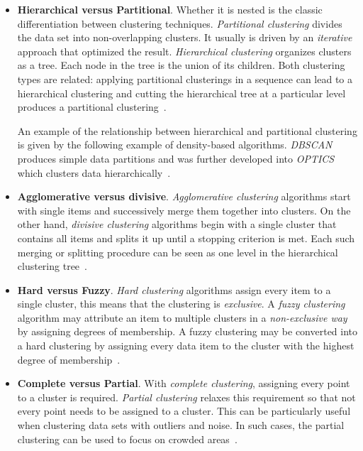 \begin{itemize}

\item \textbf{Hierarchical versus Partitional}. Whether it is nested is the classic differentiation between clustering techniques. \textit{Partitional clustering} divides the data set into non-overlapping clusters. It usually is driven by an \textit{iterative} approach that optimized the result.
\textit{Hierarchical clustering} organizes clusters as a tree. Each node in the tree is the union of its children. Both clustering types are related: applying partitional clusterings in a sequence can lead to a hierarchical clustering and cutting the hierarchical tree at a particular level produces a partitional clustering~\cite{Meert06clustermaps}. 

An example of the relationship between hierarchical and partitional clustering is given by the following example of density-based algorithms. \textit{DBSCAN} produces simple data partitions and was further developed into \textit{OPTICS} which clusters data hierarchically~\cite{wiki:DBSCAN}.     

\item \textbf{Agglomerative versus divisive}. \textit{Agglomerative clustering} algorithms start with single items and successively merge them together into clusters. On the other hand, \textit{divisive clustering} algorithms begin with a single cluster that contains all items and splits it up until a stopping criterion is met. Each such merging or splitting procedure can be seen as one level in the hierarchical clustering tree~\cite{Jain99clusterreview}.

\item \textbf{Hard versus Fuzzy}. \textit{Hard clustering} algorithms assign every item to a single cluster, this means that the clustering is \textit{exclusive}. A \textit{fuzzy clustering} algorithm may attribute an item to multiple clusters in a \textit{non-exclusive way }by assigning degrees of membership. A fuzzy clustering may be converted into a hard clustering by assigning every data item to the cluster with the highest degree of membership~\cite{Jain99clusterreview, Meert06clustermaps}.

\item \textbf{Complete versus Partial}. With \textit{complete clustering}, assigning every point to a cluster is required. \textit{Partial clustering} relaxes this requirement so that not every point needs to be assigned to a cluster. This can be particularly useful when clustering data sets with outliers and noise. In such cases, the partial clustering can be used to focus on crowded areas~\cite{Jain99clusterreview}. 

\end{itemize}

